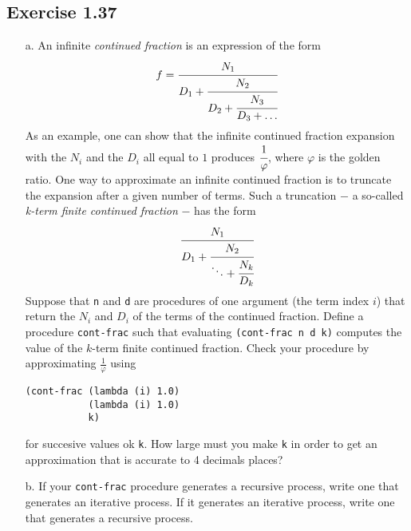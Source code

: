 \subsection*{Exercise 1.37}
\begin{itemize}
    \item[a.] An infinite \textit{continued fraction} is an expression of the form 
        \[ f = \cfrac{N_{1}}{D_{1} + \cfrac{N_{2}}{D_{2} + \cfrac{N_{3}}{D_{3} + \dots}}} \] 
        As an example, one can show that the infinite continued fraction expansion with the $ N_{i} $ and the $ D_{i} $
        all equal to $ 1 $ produces $ \cfrac{1}{\varphi} $, where $ \varphi $ is the golden ratio.
        One way to approximate an infinite continued fraction is to truncate the expansion after a given number of terms.
        Such a truncation $ - $ a so-called \textit{k-term finite continued fraction} $ - $ has the form
        \[ \cfrac{N_{1}}{D_{1} + \cfrac{N_{2}}{\ddots + \cfrac{N_{k}}{D_{k}}}} \]
        Suppose that \texttt{n} and \texttt{d} are procedures of one argument (the term index $ i $) that return the $ N_{i} $
        and $ D_{i} $ of the terms of the continued fraction.
        Define a procedure \texttt{cont-frac} such that evaluating \texttt{(cont-frac n d k)} computes the value of the $k$-term
        finite continued fraction. Check your procedure by approximating $ \frac{1}{\varphi} $ using
        \begin{lstlisting}
(cont-frac (lambda (i) 1.0)
           (lambda (i) 1.0)
           k)
        \end{lstlisting} 
        for succesive values ok \texttt{k}. How large must you make \texttt{k} in order to get an approximation that is accurate
        to 4 decimals places?
    
    \item[b.] If your \texttt{cont-frac} procedure generates a recursive process, write one that generates an iterative process. If
        it generates an iterative process, write one that generates a recursive process.    
\end{itemize}

